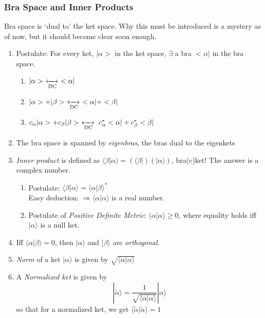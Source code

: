 \documentclass[12pt]{article}
\def\dc{\,\,\xleftrightarrow[\text{DC}]{}\,\,}
\def\bra#1{\langle#1|}
\def\ket#1{|#1 \rangle}
\def\inpr#1#2{\langle #1|#2 \rangle}
\begin{document}
			\subsubsection{Bra Space and Inner Products}
				Bra space is `dual to' the ket space. Why this must be introduced is a mystery as of now, but it should become clear soon enough.
				\begin{enumerate}
					\item Postulate: For every ket, $|\alpha>$ in the ket space, $\exists$ a bra $<\alpha|$ in the bra space.
						\begin{enumerate}
							\item $|\alpha> \dc <\alpha|$
							\item $|\alpha> + |\beta> \dc <\alpha| + <\beta|$
							\item $c_\alpha|\alpha> + c_\beta|\beta> \dc c_\alpha^*<\alpha| + c_\beta^*<\beta|$
						\end{enumerate}
					\item The bra space is spanned by \emph{eigenbras}, the bras dual to the eigenkets			
					\item \emph{Inner product} is defined as $\inpr{\beta}{\alpha} = (\bra\beta)(\ket\alpha)$, bra(c)ket! The answer is a complex number.
						\begin{enumerate}
							\item Postulate: $\inpr{\beta}{\alpha}=\inpr{\alpha}{\beta}^*$ \\
							Easy deduction: $\Rightarrow \inpr{\alpha}{\alpha}$ is a real number.
							\item Postulate of \emph{Positive Definite Metric}: $\inpr{\alpha}{\alpha} \ge 0$, where equality holds iff $\ket \alpha$ is a null ket.
						\end{enumerate}
					\item Iff $\inpr{\alpha}{\beta}=0$, then $\ket \alpha$ and $\ket \beta$ are \emph{orthogonal}.
					\item \emph{Norm} of a ket $\ket \alpha$ is given by $\sqrt{\inpr{\alpha}{\alpha}}$
					\item A \emph{Normalized ket} is given by 
					\begin{equation*}
						\ket{\tilde{\alpha}} = \frac{1}{\sqrt{\inpr{\alpha}{\alpha}}} \ket{\alpha}
					\end{equation*}
						so that for a normalized ket, we get $\inpr{\tilde{\alpha}}{\tilde{\alpha}} = 1$
				\end{enumerate}
\end{document}
